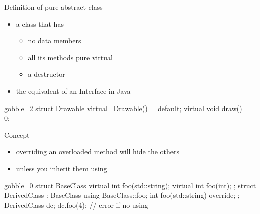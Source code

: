 \begin{frame}[fragile]
  \begin{block}{Definition of pure abstract class}
    \begin{itemize}
    \item a class that has
      \begin{itemize}
        \item no data members
        \item all its methods pure virtual
        \item a  destructor
      \end{itemize}
    \item the equivalent of an Interface in Java
    \end{itemize}
  \end{block}
  \begin{multicols}{2}
    \begin{cppcode*}{gobble=2}
      struct Drawable {
        virtual ~Drawable() = default;
        virtual void draw() = 0;
      }
    \end{cppcode*}
    \columnbreak
    \center
  \end{multicols}
\end{frame}

\begin{frame}[fragile]
  \begin{block}{Concept}
    \begin{itemize}
    \item overriding an overloaded method will hide the others
    \item unless you inherit them using 
    \end{itemize}
  \end{block}
  \begin{cppcode*}{gobble=0}
    struct BaseClass {
      virtual int foo(std::string);
      virtual int foo(int);
    };
    struct DerivedClass : BaseClass {
      using BaseClass::foo;
      int foo(std::string) override;
    };
    DerivedClass dc;
    dc.foo(4);      // error if no using
    \end{cppcode*}
\end{frame}

